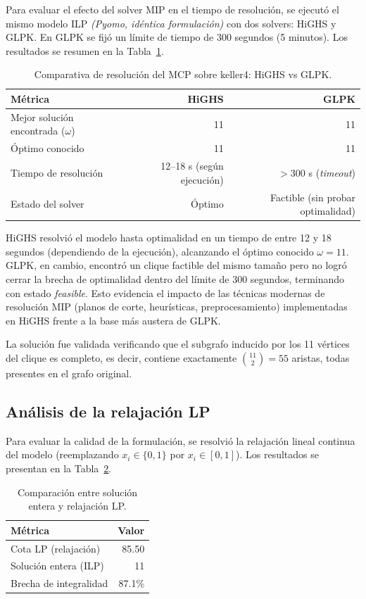 Para evaluar el efecto del solver MIP en el tiempo de resolución, se ejecutó el mismo modelo ILP \emph{(Pyomo, idéntica formulación)} con dos solvers: HiGHS \parencite{highs2024} y GLPK. En GLPK se fijó un límite de tiempo de 300 segundos (5 minutos). Los resultados se resumen en la Tabla~\ref{tab:resultados}.

\begin{table}[H]
\centering
\caption{Comparativa de resolución del MCP sobre keller4: HiGHS vs GLPK.}
\label{tab:resultados}
\begin{tabular}{lrr}
\hline
\textbf{Métrica} & \textbf{HiGHS} & \textbf{GLPK} \\
\hline
Mejor solución encontrada ($\omega$) & 11 & 11 \\
Óptimo conocido & 11 & 11 \\
Tiempo de resolución & 12--18 s (según ejecución) & $> 300$ s (\textit{timeout}) \\
Estado del solver & Óptimo & Factible (sin probar optimalidad) \\
\hline
\end{tabular}
\end{table}

HiGHS resolvió el modelo hasta optimalidad en un tiempo de entre 12 y 18 segundos (dependiendo de la ejecución), alcanzando el óptimo conocido $\omega = 11$. GLPK, en cambio, encontró un clique factible del mismo tamaño pero no logró cerrar la brecha de optimalidad dentro del límite de 300 segundos, terminando con estado \textit{feasible}. Esto evidencia el impacto de las técnicas modernas de resolución MIP (planos de corte, heurísticas, preprocesamiento) implementadas en HiGHS frente a la base más austera de GLPK.

La solución fue validada verificando que el subgrafo inducido por los 11 vértices del clique es completo, es decir, contiene exactamente $\binom{11}{2} = 55$ aristas, todas presentes en el grafo original.

\subsection{Análisis de la relajación LP}

Para evaluar la calidad de la formulación, se resolvió la relajación lineal continua del modelo (reemplazando $x_i \in \{0,1\}$ por $x_i \in [0,1]$). Los resultados se presentan en la Tabla~\ref{tab:relajacion}.

\begin{table}[H]
\centering
\caption{Comparación entre solución entera y relajación LP.}
\label{tab:relajacion}
\begin{tabular}{lr}
\hline
\textbf{Métrica} & \textbf{Valor} \\
\hline
Cota LP (relajación) & 85.50 \\
Solución entera (ILP) & 11 \\
Brecha de integralidad & 87.1\% \\
\hline
\end{tabular}
\end{table}

